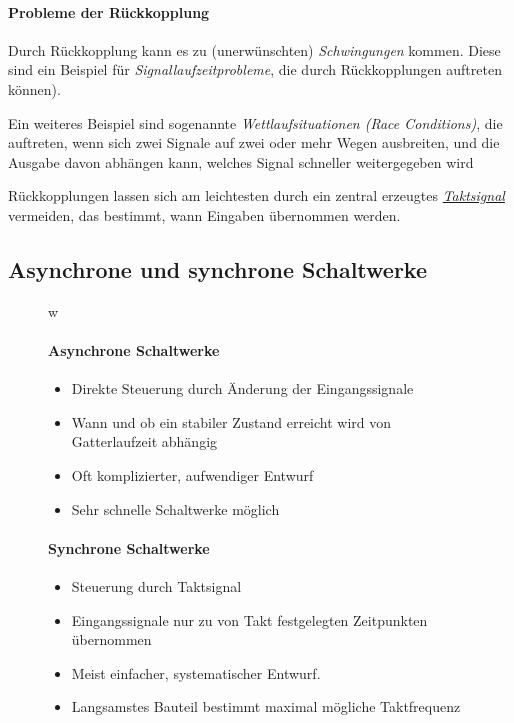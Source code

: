 \documentclass[12pt]{report}
\begin{document}
\paragraph{Probleme der Rückkopplung}

Durch Rückkopplung kann es zu (unerwünschten) \textit{Schwingungen} kommen. 
Diese sind ein Beispiel für \textit{Signallaufzeitprobleme}, die durch Rückkopplungen auftreten können).

Ein weiteres Beispiel sind sogenannte \textit{Wettlaufsituationen (Race Conditions)}, die auftreten, 
wenn sich zwei Signale auf zwei oder mehr Wegen ausbreiten, und die Ausgabe davon abhängen kann, 
welches Signal schneller weitergegeben wird

Rückkopplungen lassen sich am leichtesten durch ein zentral erzeugtes \underline{\textit{Taktsignal}} vermeiden, 
das bestimmt, wann Eingaben übernommen werden.

\subsection{Asynchrone und synchrone Schaltwerke}

\begin{figure}[H]
  \begin{minipage}[T]{0.45\textwidth} w
    \centering
    \paragraph{Asynchrone Schaltwerke}
    \begin{itemize}
      \item Direkte Steuerung durch Änderung der Eingangssignale
      \item Wann und ob ein stabiler Zustand erreicht wird von Gatterlaufzeit abhängig
      \item Oft komplizierter, aufwendiger Entwurf
      \item Sehr schnelle Schaltwerke möglich
    \end{itemize}
  \end{minipage}
  \hfill
  \begin{minipage}[T]{0.45\textwidth}
    \centering
    \paragraph{Synchrone Schaltwerke}
    \begin{itemize}
      \item Steuerung durch Taktsignal
      \item Eingangssignale nur zu von Takt festgelegten Zeitpunkten übernommen
      \item Meist einfacher, systematischer Entwurf.
      \item Langsamstes Bauteil bestimmt maximal mögliche Taktfrequenz
    \end{itemize}
  \end{minipage}
\end{figure}
\end{document}

